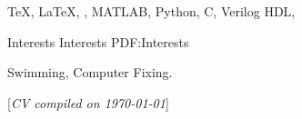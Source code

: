 \documentclass[letterpaper,MMMyyyy,nonstopmode]{simpleresumecv}
\newcommand{\CVNote}{CV compiled on {\today}}
\begin{document}
\begin{Body}
\Entry
{\TeX}, {\LaTeX}, {\XeLaTeX},
MATLAB,
Python,
C,
Verilog HDL,





\Section
{Interests}
{Interests}
{PDF:Interests}

\Entry
Swimming, Computer Fixing.



%




\end{Body}


\UseNoteFont%
\null\hfill%
[\textit{\CVNote}]
\end{document}
